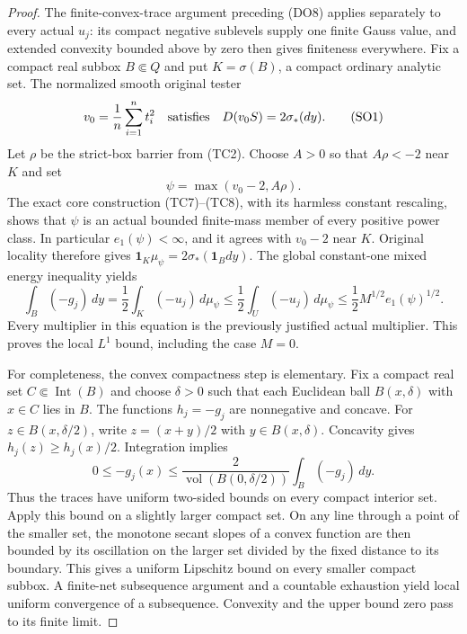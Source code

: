 \begin{proof}
The finite-convex-trace argument preceding (DO8) applies separately
to every actual $u_j$: its compact negative sublevels supply one
finite Gauss value, and extended convexity bounded above by zero
then gives finiteness everywhere.  Fix a compact real subbox
$B\Subset Q$ and put $K=\sigma(B)$, a compact ordinary analytic
set.  The normalized smooth original tester
\[
                v_0=\frac1n\sum_{i=1}^n t_i^2
           \quad\hbox{satisfies}\quad
                D(v_0S)=2\sigma_*(dy).
 \tag{SO1}
\]
Let $\rho$ be the strict-box barrier from (TC2).
Choose $A>0$ so that $A\rho<-2$ near $K$ and set
\[
                     \psi=\max(v_0-2,A\rho).
 \tag{SO2}
\]
The exact core construction (TC7)--(TC8), with its harmless
constant rescaling, shows that $\psi$ is an actual bounded
finite-mass member of every positive power class.  In particular
$e_1(\psi)<\infty$, and it agrees with $v_0-2$ near $K$.
Original locality therefore gives
$\mathbf1_K\mu_\psi=2\sigma_*(\mathbf1_Bdy)$.
The global constant-one mixed energy inequality yields
\[
 \int_B(-g_j)\,dy
   =\frac12\int_K(-u_j)\,d\mu_\psi
   \leq\frac12\int_U(-u_j)\,d\mu_\psi
   \leq\frac12M^{1/2}e_1(\psi)^{1/2}.
 \tag{SO3}
\]
Every multiplier in this equation is the previously justified
actual multiplier.  This proves the local $L^1$ bound, including
the case $M=0$.

For completeness, the convex compactness step is elementary.
Fix a compact real set $C\Subset\operatorname{Int}(B)$ and
choose $\delta>0$ such that each Euclidean ball
$B(x,\delta)$ with $x\in C$ lies in $B$.
The functions $h_j=-g_j$ are nonnegative and concave.
For $z\in B(x,\delta/2)$, write $z=(x+y)/2$ with
$y\in B(x,\delta)$.  Concavity gives
$h_j(z)\geq h_j(x)/2$.  Integration implies
\[
 0\leq -g_j(x)
       \leq\frac{2}{\operatorname{vol}(B(0,\delta/2))}
                       \int_B(-g_j)\,dy.
 \tag{SO4}
\]
Thus the traces have uniform two-sided bounds on every compact
interior set.  Apply this bound on a slightly larger compact
set.  On any line through a point of the smaller set, the
monotone secant slopes of a convex function are then bounded
by its oscillation on the larger set divided by the fixed
distance to its boundary.  This gives a uniform Lipschitz
bound on every smaller compact subbox.  A finite-net
subsequence argument and a countable exhaustion yield local
uniform convergence of a subsequence.  Convexity and the
upper bound zero pass to its finite limit.
\end{proof}

